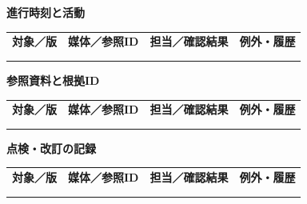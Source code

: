 \documentclass[11pt,a4paper]{article}
\begin{document}
\par{}\noindent\textbf{進行時刻と活動}\par\vspace{1mm}
{\fontsize{8.5}{13}\selectfont
\begin{tabularx}{\linewidth}{@{}XXXX@{}}
\textbf{対象／版} & \textbf{媒体／参照ID} & \textbf{担当／確認結果} & \textbf{例外・履歴}\\[2mm]
\strut & \strut & \strut & \strut\\[5mm]
\strut & \strut & \strut & \strut\\[5mm]
\end{tabularx}
}\vspace{2mm}\par
{}
\par{}\noindent\textbf{参照資料と根拠ID}\par\vspace{1mm}
{\fontsize{8.5}{13}\selectfont
\begin{tabularx}{\linewidth}{@{}XXXX@{}}
\textbf{対象／版} & \textbf{媒体／参照ID} & \textbf{担当／確認結果} & \textbf{例外・履歴}\\[2mm]
\strut & \strut & \strut & \strut\\[5mm]
\strut & \strut & \strut & \strut\\[5mm]
\end{tabularx}
}\vspace{2mm}\par
{}
\par{}\noindent\textbf{点検・改訂の記録}\par\vspace{1mm}
{\fontsize{8.5}{13}\selectfont
\begin{tabularx}{\linewidth}{@{}XXXX@{}}
\textbf{対象／版} & \textbf{媒体／参照ID} & \textbf{担当／確認結果} & \textbf{例外・履歴}\\[2mm]
\strut & \strut & \strut & \strut\\[5mm]
\strut & \strut & \strut & \strut\\[5mm]
\end{tabularx}
}\vspace{2mm}\par
\end{document}
